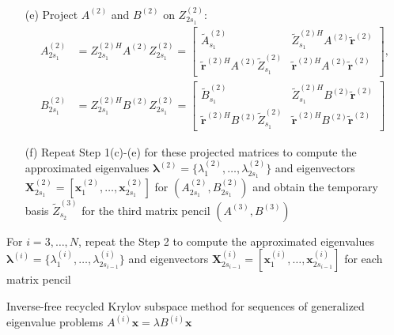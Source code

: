 \begin{algorithm}[H]
\begin{algorithmic}[1]
\begin{itemize}
            \item[(e)] Project $A^{(2)}$ and $B^{(2)}$ on $Z_{2s_{1}}^{(2)}$: 
            \begin{align*}
                A_{2s_{1}}^{(2)} &= Z_{2s_{1}}^{(2)H}A^{(2)} Z_{2s_{1}}^{(2)} = \begin{bmatrix}
                 \tilde{A}_{s_{1}}^{(2)} & \tilde{Z}_{s_{1}}^{(2)H}A^{(2)} \tilde{\boldsymbol{r}}^{(2)}\\
                 \tilde{\boldsymbol{r}}^{(2)H} A^{(2)} \tilde{Z}_{s_{1}}^{(2)} & \tilde{\boldsymbol{r}}^{(2)H} A^{(2)} \tilde{\boldsymbol{r}}^{(2)}
                \end{bmatrix}, \\
                B_{2s_{1}}^{(2)} &= Z_{2s_{1}}^{(2)H}B^{(2)}Z_{2s_{1}}^{(2)} = \begin{bmatrix}
                 \tilde{B}_{s_{1}}^{(2)} & \tilde{Z}_{s_{1}}^{(2)H}B^{(2)} \tilde{\boldsymbol{r}}^{(2)}\\
                 \tilde{\boldsymbol{r}}^{(2)H} B^{(2)} \tilde{Z}_{s_{1}}^{(2)} & \tilde{\boldsymbol{r}}^{(2)H} B^{(2)} \tilde{\boldsymbol{r}}^{(2)}
                \end{bmatrix}
            \end{align*}
            \item[(f)] Repeat Step 1(c)-(e) for these projected matrices to compute the approximated eigenvalues $\boldsymbol{\lambda}^{(2)} = \{\lambda_{1}^{(2)}, \dots, \lambda_{2s_{1}}^{(2)}\}$  and eigenvectors $\boldsymbol{X}_{2s_{1}}^{(2)} = \left[\boldsymbol{x}_{1}^{(2)}, \dots, \boldsymbol{x}_{2s_{1}}^{(2)}\right]$ for $\left( A_{2s_{1}}^{(2)},  B_{2s_{1}}^{(2)}\right)$ and obtain the temporary basis $\tilde{Z}_{s_{2}}^{(3)}$ for the third matrix pencil $\left(A^{(3)}, B^{(3)}\right)$
        \end{itemize}
        
        \STATE For $i = 3, \dots, N$, repeat the Step 2 to compute the approximated eigenvalues $\boldsymbol{\lambda}^{(i)} = \{\lambda_{1}^{(i)}, \dots, \lambda_{2s_{i-1}}^{(i)}\}$  and eigenvectors $\boldsymbol{X}_{2s_{i-1}}^{(i)} = \left[\boldsymbol{x}_{1}^{(i)}, \dots, \boldsymbol{x}_{2s_{i-1}}^{(i)}\right]$ for each matrix pencil
        \end{algorithmic}
    \caption{Inverse-free recycled Krylov subspace method for sequences of generalized eigenvalue problems $A^{(i)}\boldsymbol{x} = \lambda B^{(i)}\boldsymbol{x}$}
    \label{Alg for computing the evals kry recycled}
    \end{algorithm}    

